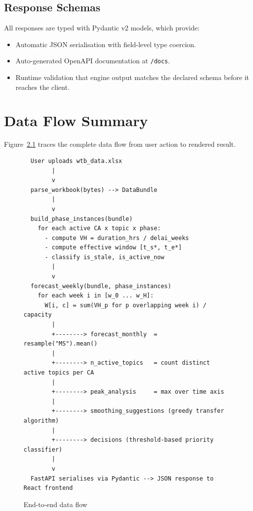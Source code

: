 \documentclass[12pt,a4paper]{report}
\begin{document}
\section{Response Schemas}

All responses are typed with Pydantic v2 models, which provide:
\begin{itemize}
  \item Automatic JSON serialisation with field-level type coercion.
  \item Auto-generated OpenAPI documentation at \texttt{/docs}.
  \item Runtime validation that engine output matches the declared schema
        before it reaches the client.
\end{itemize}

\chapter{Data Flow Summary}

Figure~\ref{fig:dataflow} traces the complete data flow from user action
to rendered result.

\begin{figure}[H]
\centering
\begin{tcolorbox}[colback=gray!7, colframe=gray!50, sharp corners]
\small\ttfamily
\begin{verbatim}
  User uploads wtb_data.xlsx
        |
        v
  parse_workbook(bytes) --> DataBundle
        |
        v
  build_phase_instances(bundle)
    for each active CA x topic x phase:
      - compute VH = duration_hrs / delai_weeks
      - compute effective window [t_s*, t_e*]
      - classify is_stale, is_active_now
        |
        v
  forecast_weekly(bundle, phase_instances)
    for each week i in [w_0 ... w_H]:
      W[i, c] = sum(VH_p for p overlapping week i) / capacity
        |
        +--------> forecast_monthly  = resample("MS").mean()
        |
        +--------> n_active_topics   = count distinct active topics per CA
        |
        +--------> peak_analysis     = max over time axis
        |
        +--------> smoothing_suggestions (greedy transfer algorithm)
        |
        +--------> decisions (threshold-based priority classifier)
        |
        v
  FastAPI serialises via Pydantic --> JSON response to React frontend
\end{verbatim}
\end{tcolorbox}
\caption{End-to-end data flow}
\label{fig:dataflow}
\end{figure}
\end{document}
